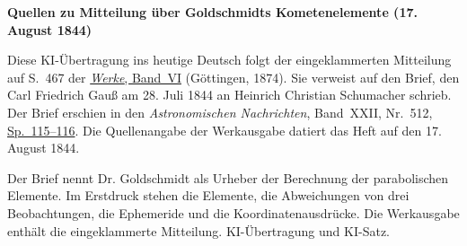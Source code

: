 \clearpage\thispagestyle{empty}
\begin{center}\textbf{Quellen zu Mitteilung über Goldschmidts Kometenelemente (17. August 1844)}\end{center}
\noindent Diese KI-Übertragung ins heutige Deutsch folgt der eingeklammerten Mitteilung auf S.~467 der \href{https://gdz.sub.uni-goettingen.de/id/PPN236007467}{\textit{Werke}, Band~VI} (Göttingen, 1874). Sie verweist auf den Brief, den Carl Friedrich Gauß am 28. Juli 1844 an Heinrich Christian Schumacher schrieb. Der Brief erschien in den \textit{Astronomischen Nachrichten}, Band~XXII, Nr.~512, \href{https://api.digitale-sammlungen.de/iiif/image/v2/bsb10049447_00066/full/1800,/0/default.jpg}{Sp.~115--116}. Die Quellenangabe der Werkausgabe datiert das Heft auf den 17. August 1844.
\par\smallskip\noindent Der Brief nennt Dr. Goldschmidt als Urheber der Berechnung der parabolischen Elemente. Im Erstdruck stehen die Elemente, die Abweichungen von drei Beobachtungen, die Ephemeride und die Koordinatenausdrücke. Die Werkausgabe enthält die eingeklammerte Mitteilung. KI-Übertragung und KI-Satz.
\clearpage
